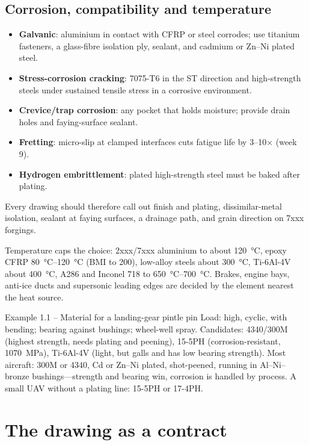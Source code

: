 \documentclass[11pt,a4paper]{article}
\begin{document}
\subsection{Corrosion, compatibility and temperature}
\begin{itemize}[nosep]
  \item \textbf{Galvanic}: aluminium in contact with CFRP or steel corrodes; use titanium fasteners, a glass-fibre isolation ply, sealant, and cadmium or Zn--Ni plated steel.
  \item \textbf{Stress-corrosion cracking}: 7075-T6 in the ST direction and high-strength steels under sustained tensile stress in a corrosive environment.
  \item \textbf{Crevice/trap corrosion}: any pocket that holds moisture; provide drain holes and faying-surface sealant.
  \item \textbf{Fretting}: micro-slip at clamped interfaces cuts fatigue life by 3--10$\times$ (week 9).
  \item \textbf{Hydrogen embrittlement}: plated high-strength steel must be baked after plating.
\end{itemize}
Every drawing should therefore call out finish and plating, dissimilar-metal isolation, sealant at faying surfaces, a drainage path, and grain direction on 7xxx forgings.

Temperature caps the choice: 2xxx/7xxx aluminium to about \SI{120}{\celsius}, epoxy CFRP \SIrange{80}{120}{\celsius} (BMI to 200), low-alloy steels about \SI{300}{\celsius}, Ti-6Al-4V about \SI{400}{\celsius}, A286 and Inconel 718 to \SIrange{650}{700}{\celsius}. Brakes, engine bays, anti-ice ducts and supersonic leading edges are decided by the element nearest the heat source.

\begin{examplebox}{Example 1.1 -- Material for a landing-gear pintle pin}
Load: high, cyclic, with bending; bearing against bushings; wheel-well spray. Candidates: 4340/300M (highest strength, needs plating and peening), 15-5PH (corrosion-resistant, \SI{1070}{MPa}), Ti-6Al-4V (light, but galls and has low bearing strength). Most aircraft: 300M or 4340, Cd or Zn--Ni plated, shot-peened, running in Al--Ni--bronze bushings---strength and bearing win, corrosion is handled by process. A small UAV without a plating line: 15-5PH or 17-4PH.
\end{examplebox}

\section{The drawing as a contract}
\end{document}
